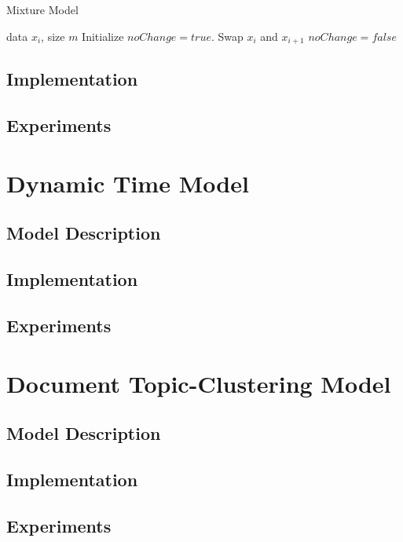 \documentclass{article}
\begin{document}
    \begin{algorithm}[tb]
       \caption{Mixture Model}
       \label{alg:example}
    \begin{algorithmic}
        data $x_i$, size $m$
       \REPEAT
       \STATE Initialize $noChange = true$.
       \STATE Swap $x_i$ and $x_{i+1}$
       \STATE $noChange = false$
       \ENDIF
       \ENDFOR
    \end{algorithmic}
    \end{algorithm}
\subsection{Implementation} 
\subsection{Experiments} 



\section{Dynamic Time Model} 
\subsection{Model Description} 
\subsection{Implementation} 
\subsection{Experiments} 




\section{Document Topic-Clustering Model} 
\subsection{Model Description} 
\subsection{Implementation} 
\subsection{Experiments} 
\end{document}
